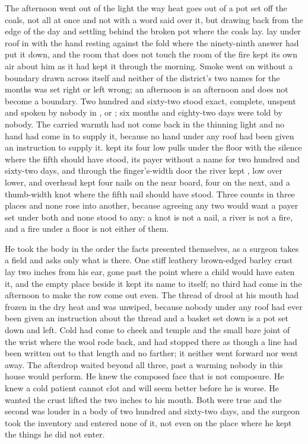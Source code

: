The afternoon went out of the light the way heat goes out of a pot set off the coals, not all at once and not with a word said over it, but drawing back from the edge of the day and settling behind the broken pot where the coals lay.  lay under  roof in  with the hand resting against the fold where the ninety-ninth answer had put it down, and the room that does not touch the room of the fire kept its own air about him as it had kept it through the morning. Smoke went on without a boundary drawn across itself and neither of the district's two names for the months was set right or left wrong; an afternoon is an afternoon and does not become a boundary. Two hundred and sixty-two stood exact, complete, unspent and spoken by nobody in ,  or ; six months and eighty-two days were told by nobody. The carried warmth had not come back in the thinning light and no hand had come in to supply it, because no hand under any roof had been given an instruction to supply it.  kept its four low pulls under the floor with the silence where the fifth should have stood, its payer without a name for two hundred and sixty-two days, and through the finger's-width door the river kept , low over lower, and overhead  kept four nails on the near board, four on the next, and a thumb-width knot where the fifth nail should have stood. Three counts in three places and none rose into another, because agreeing any two would want a payer set under both and none stood to any: a knot is not a nail, a river is not a fire, and a fire under a floor is not either of them.

He took the body in the order the facts presented themselves, as a surgeon takes a field and asks only what is there. One stiff leathery brown-edged barley crust lay two inches from his ear, gone past the point where a child would have eaten it, and the empty place beside it kept its name to itself; no third had come in the afternoon to make the row come out even. The thread of drool at his mouth had frozen in the dry heat and was unwiped, because nobody under any roof had ever been given an instruction about the thread and a basket set down is a pot set down and left. Cold had come to cheek and temple and the small bare joint of the wrist where the wool rode back, and had stopped there as though a line had been written out to that length and no farther; it neither went forward nor went away. The afterdrop waited beyond all three, past a warming nobody in this house would perform. He knew the composed face that is not composure. He knew a cold patient cannot clot and will seem better before he is worse. He wanted the crust lifted the two inches to his mouth. Both were true and the second was louder in a body of two hundred and sixty-two days, and the surgeon took the inventory and entered none of it, not even on the place where he kept the things he did not enter.

